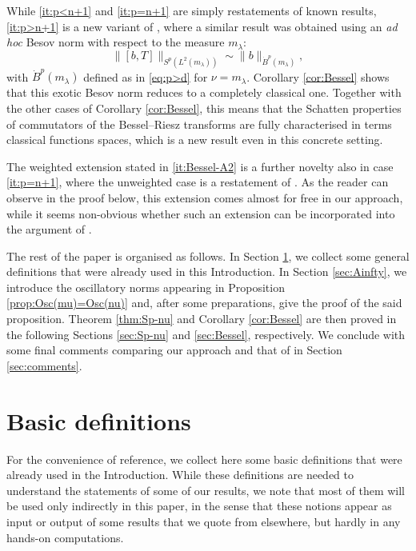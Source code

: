 \documentclass[reqno]{amsart}
\newcommand{\Norm}[2]{\|#1\|_{#2}}
\theoremstyle{plain}
\theoremstyle{definition}
\theoremstyle{remark}
\begin{document}
While \eqref{it:p<n+1} and \eqref{it:p=n+1} are simply restatements of known results, \eqref{it:p>n+1} is a new variant of \cite[Theorem 1.4]{FLLX}, where a similar result was obtained using an {\em ad hoc} Besov norm with respect to the measure $m_\lambda$:
\begin{equation*}
  \Norm{[b,T]}{S^p(L^2(m_\lambda))}
  \sim \Norm{b}{\dot B^p(m_\lambda)},
\end{equation*}
with $\dot B^p(m_\lambda)$ defined as in \eqref{eq:p>d} for $\nu=m_\lambda$.
Corollary \ref{cor:Bessel} shows that this exotic Besov norm reduces to a completely classical one. Together with the other cases of Corollary \ref{cor:Bessel}, this means that the Schatten properties of commutators of the Bessel--Riesz transforms are fully characterised in terms classical functions spaces, which is a new result even in this concrete setting.

The weighted extension stated in \eqref{it:Bessel-A2} is a further novelty also in case \eqref{it:p=n+1}, where the unweighted case is a restatement of \cite[Theorem 1.2]{FLSZ}. As the reader can observe in the proof below, this extension comes almost for free in our approach, while it seems non-obvious whether such an extension can be incorporated into the argument of \cite{FLSZ}.

The rest of the paper is organised as follows. In Section \ref{sec:basic}, we collect some general definitions that were already used in this Introduction. In Section \ref{sec:Ainfty}, we introduce the oscillatory norms appearing in Proposition \ref{prop:Osc(mu)=Osc(nu)} and, after some preparations, give the proof of the said proposition. Theorem \ref{thm:Sp-nu} and Corollary \ref{cor:Bessel} are then proved in the following Sections \ref{sec:Sp-nu} and \ref{sec:Bessel}, respectively. We conclude with some final comments comparing our approach and that of \cite{FLSZ} in Section \ref{sec:comments}.

\section{Basic definitions}\label{sec:basic}

For the convenience of reference, we collect here some basic definitions that were already used in the Introduction.
While these definitions are needed to understand the statements of some of our results, we note that most of them will be used only indirectly in this paper, in the sense that these notions appear as input or output of some results that we quote from elsewhere, but hardly in any hands-on computations.
\end{document}
